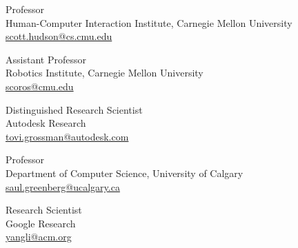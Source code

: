  {
	 {
		Professor\\
		Human-Computer Interaction Institute, Carnegie Mellon University\\
		\url{scott.hudson@cs.cmu.edu}
	}
}

 {
	 {
		Assistant Professor\\
		Robotics Institute, Carnegie Mellon University\\
		\url{scoros@cmu.edu}
	}
}


 {
	 {
		Distinguished Research Scientist\\
		Autodesk Research\\
		\url{tovi.grossman@autodesk.com}
	}
}

 {
	 {
		Professor\\
		Department of Computer Science, University of Calgary\\
		\url{saul.greenberg@ucalgary.ca}
	}
}

 {
	 {
		Research Scientist\\
		Google Research\\
		\url{yangli@acm.org}
	}
}